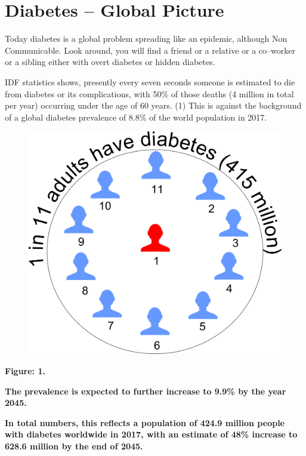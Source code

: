 \chapter{Diabetes – Global Picture}

Today diabetes is a global problem spreading like an epidemic, although Non Communicable. Look around, you will find a friend or a relative or a co–worker or a sibling either with overt diabetes or hidden diabetes.

IDF statistics shows, presently every seven seconds someone is estimated to die from diabetes or its complications, with 50\% of those deaths (4 million in total per year) occurring under the age of 60 years. (1) This is against the background of a global diabetes prevalence of 8.8\% of the world population in 2017.

\begin{figure}
\includegraphics{images/034.jpg}
\end{figure}

\textbf{Figure: 1.}

\item \textbf{The prevalence is expected to further increase to 9.9\% by the year 2045.}

 \item \textbf{In total numbers, this reflects a population of 424.9 million people with diabetes worldwide in 2017, with an estimate of 48\% increase to 628.6 million by the end of 2045.}

